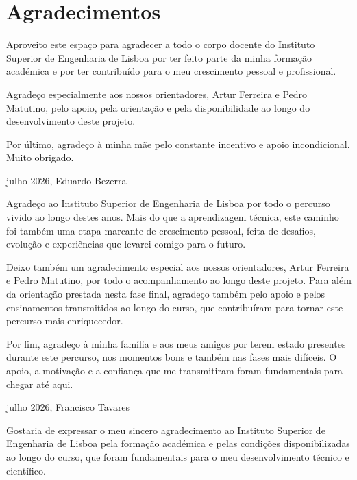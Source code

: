 \documentclass[a4paper,openright,twoside,11pt]{report}
\begin{document}
\cleardoublepage
\chapter*{Agradecimentos}



\noindent Aproveito este espaço para agradecer a todo o corpo docente do Instituto Superior de Engenharia de Lisboa por ter feito parte da minha formação académica e por ter contribuído para o meu crescimento pessoal e profissional.

\noindent Agradeço especialmente aos nossos orientadores, Artur Ferreira e Pedro Matutino, pelo apoio, pela orientação e pela disponibilidade ao longo do desenvolvimento deste projeto.

\noindent Por último, agradeço à minha mãe pelo constante incentivo e apoio incondicional. Muito obrigado.

\hfill julho 2026, Eduardo Bezerra


\vspace{1cm}

\vspace{1cm}

\noindent Agradeço ao Instituto Superior de Engenharia de Lisboa por todo o percurso vivido ao longo destes anos. Mais do que a aprendizagem técnica, este caminho foi também uma etapa marcante de crescimento pessoal, feita de desafios, evolução e experiências que levarei comigo para o futuro.

\noindent Deixo também um agradecimento especial aos nossos orientadores, Artur Ferreira e Pedro Matutino, por todo o acompanhamento ao longo deste projeto. Para além da orientação prestada nesta fase final, agradeço também pelo apoio e pelos ensinamentos transmitidos ao longo do curso, que contribuíram para tornar este percurso mais enriquecedor.

\noindent Por fim, agradeço à minha família e aos meus amigos por terem estado presentes durante este percurso, nos momentos bons e também nas fases mais difíceis. O apoio, a motivação e a confiança que me transmitiram foram fundamentais para chegar até aqui.

\hfill julho 2026, Francisco Tavares


\vspace{1cm}

\vspace{1cm}

\noindent Gostaria de expressar o meu sincero agradecimento ao Instituto Superior de Engenharia de Lisboa pela formação académica e pelas condições disponibilizadas ao longo do curso, que foram fundamentais para o meu desenvolvimento técnico e científico.
\end{document}
